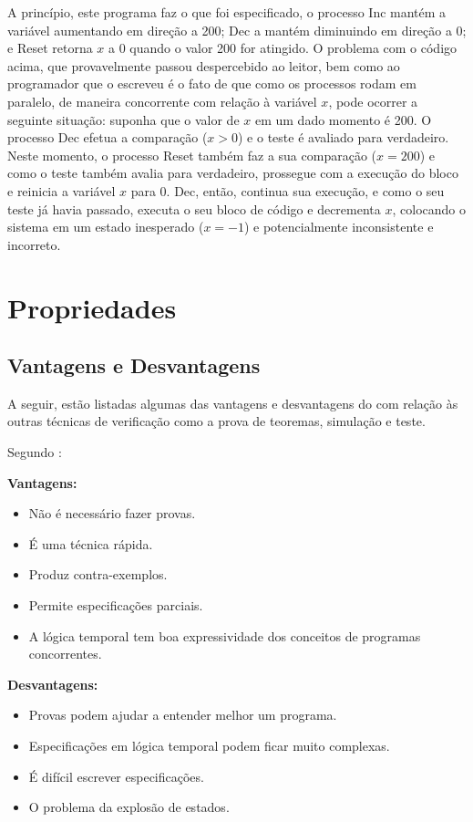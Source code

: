 \documentclass{utfpr-pg}
\begin{document}
A princípio, este programa faz o que foi especificado, o processo \textsf{Inc} mantém a variável aumentando em direção a 200; \textsf{Dec} a mantém diminuindo em direção a 0; e \textsf{Reset} retorna $\mathit{x}$ a 0 quando o valor 200 for atingido. O problema com o código acima, que provavelmente passou despercebido ao leitor, bem como ao programador que o escreveu é o fato de que como os processos rodam em paralelo, de maneira concorrente com relação à variável $\mathit{x}$, pode ocorrer a seguinte situação: suponha que o valor de $\mathit{x}$ em um dado momento é 200. O processo \textsf{Dec} efetua a comparação ($\mathit{x} > 0$) e o teste é avaliado para verdadeiro. Neste momento, o processo \textsf{Reset} também faz a sua comparação ($\mathit{x} = 200$) e como o teste também avalia para verdadeiro, prossegue com a execução do bloco e reinicia a variável $\mathit{x}$ para 0. \textsf{Dec}, então, continua sua execução, e como o seu teste já havia passado, executa o seu bloco de código e decrementa $\mathit{x}$, colocando o sistema em um estado inesperado ($\mathit{x} = -1$) e potencialmente inconsistente e incorreto.

\section{Propriedades}
\lipsum[55]

\subsection{Vantagens e Desvantagens}
A seguir, estão listadas algumas das vantagens e desvantagens do com relação às outras técnicas de verificação como a prova de teoremas, simulação e teste.

Segundo :

\noindent
\begin{minipage}[t]{0.49\columnwidth}%
\noindent \textbf{Vantagens:}
\begin{itemize}
\item Não é necessário fazer provas.
\item É uma técnica rápida.
\item Produz contra-exemplos.
\item Permite especificações parciais.
\item A lógica temporal tem boa expressividade dos conceitos de programas concorrentes.
\end{itemize}
\end{minipage}%
\begin{minipage}[t]{0.49\columnwidth}%
\textbf{Desvantagens:}
\begin{itemize}
\item Provas podem ajudar a entender melhor um programa.
\item Especificações em lógica temporal podem ficar muito complexas.
\item É difícil escrever especificações.
\item O problema da explosão de estados.
\end{itemize}
\end{minipage}
\end{document}

